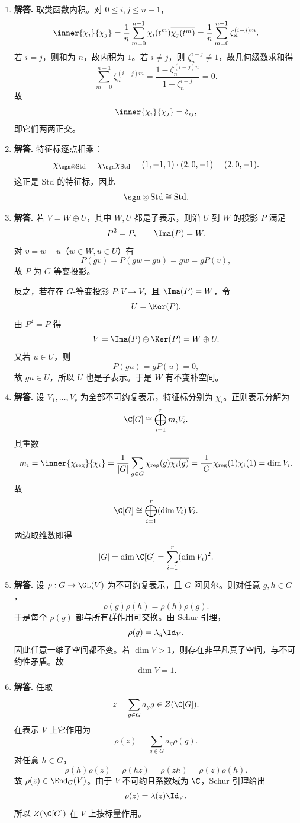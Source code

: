 \begin{enumerate}[label=\textbf{\arabic*.}, leftmargin=*, itemsep=1em]
\item \textbf{解答.} 取类函数内积。对 $0\le i,j\le n-1$，
\[
\inner{\chi_i}{\chi_j}
=\frac1n\sum_{m=0}^{n-1}\chi_i(t^m)\overline{\chi_j(t^m)}
=\frac1n\sum_{m=0}^{n-1}\zeta_n^{(i-j)m}.
\]
若 $i=j$，则和为 $n$，故内积为 $1$。若 $i\neq j$，则 $\zeta_n^{i-j}\neq1$，故几何级数求和得
\[
\sum_{m=0}^{n-1}\zeta_n^{(i-j)m}
=\frac{1-\zeta_n^{(i-j)n}}{1-\zeta_n^{i-j}}=0.
\]
故
\[
\inner{\chi_i}{\chi_j}=\delta_{ij},
\]
即它们两两正交。

\item \textbf{解答.} 特征标逐点相乘：
\[
\chi_{\sgn\otimes\mathrm{Std}}
=\chi_{\sgn}\chi_{\mathrm{Std}}
=(1,-1,1)\cdot(2,0,-1)=(2,0,-1).
\]
这正是 $\mathrm{Std}$ 的特征标，因此
\[
\sgn\otimes\mathrm{Std}\cong \mathrm{Std}.
\]

\item \textbf{解答.} 若 $V=W\oplus U$，其中 $W,U$ 都是子表示，则沿 $U$ 到 $W$ 的投影 $P$ 满足
\[
P^2=P,\qquad \Ima(P)=W.
\]
对 $v=w+u$（$w\in W,u\in U$）有
\[
P(gv)=P(gw+gu)=gw=gP(v),
\]
故 $P$ 为 $G$-等变投影。

反之，若存在 $G$-等变投影 $P:V\to V$，且 $\Ima(P)=W$，令
\[
U=\Ker(P).
\]
由 $P^2=P$ 得
\[
V=\Ima(P)\oplus\Ker(P)=W\oplus U.
\]
又若 $u\in U$，则
\[
P(gu)=gP(u)=0,
\]
故 $gu\in U$，所以 $U$ 也是子表示。于是 $W$ 有不变补空间。

\item \textbf{解答.} 设 $V_1,\dots,V_r$ 为全部不可约复表示，特征标分别为 $\chi_i$。正则表示分解为
\[
\C[G]\cong \bigoplus_{i=1}^r m_iV_i.
\]
其重数
\[
m_i=\inner{\chi_{\mathrm{reg}}}{\chi_i}
=\frac1{|G|}\sum_{g\in G}\chi_{\mathrm{reg}}(g)\overline{\chi_i(g)}
=\frac1{|G|}\chi_{\mathrm{reg}}(1)\chi_i(1)
=\dim V_i.
\]
故
\[
\C[G]\cong \bigoplus_{i=1}^r (\dim V_i)\,V_i.
\]
两边取维数即得
\[
|G|=\dim \C[G]=\sum_{i=1}^r (\dim V_i)^2.
\]

\item \textbf{解答.} 设 $\rho:G\to \GL(V)$ 为不可约复表示，且 $G$ 阿贝尔。则对任意 $g,h\in G$，
\[
\rho(g)\rho(h)=\rho(h)\rho(g).
\]
于是每个 $\rho(g)$ 都与所有群作用可交换。由 Schur 引理，
\[
\rho(g)=\lambda_g\Id_V.
\]
因此任意一维子空间都不变。若 $\dim V>1$，则存在非平凡真子空间，与不可约性矛盾。故
\[
\dim V=1.
\]

\item \textbf{解答.} 任取
\[
z=\sum_{g\in G}a_gg\in Z(\C[G]).
\]
在表示 $V$ 上它作用为
\[
\rho(z)=\sum_{g\in G}a_g\rho(g).
\]
对任意 $h\in G$，
\[
\rho(h)\rho(z)=\rho(hz)=\rho(zh)=\rho(z)\rho(h).
\]
故 $\rho(z)\in \End_G(V)$。由于 $V$ 不可约且系数域为 $\C$，Schur 引理给出
\[
\rho(z)=\lambda(z)\Id_V.
\]
所以 $Z(\C[G])$ 在 $V$ 上按标量作用。


\end{enumerate}
